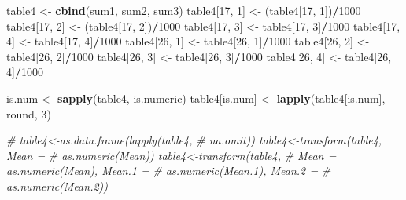 \documentclass[]{tufte-handout}
\newenvironment{Shaded}{\begin{snugshade}}{\end{snugshade}}
\newcommand{\KeywordTok}[1]{\textcolor[rgb]{0.13,0.29,0.53}{\textbf{#1}}}
\newcommand{\DecValTok}[1]{\textcolor[rgb]{0.00,0.00,0.81}{#1}}
\newcommand{\StringTok}[1]{\textcolor[rgb]{0.31,0.60,0.02}{#1}}
\newcommand{\CommentTok}[1]{\textcolor[rgb]{0.56,0.35,0.01}{\textit{#1}}}
\newcommand{\OperatorTok}[1]{\textcolor[rgb]{0.81,0.36,0.00}{\textbf{#1}}}
\newcommand{\NormalTok}[1]{#1}
\begin{document}
\begin{Shaded}
\begin{Highlighting}[]
\NormalTok{table4 <-}\StringTok{ }\KeywordTok{cbind}\NormalTok{(sum1, sum2, sum3)}
\NormalTok{table4[}\DecValTok{17}\NormalTok{, }\DecValTok{1}\NormalTok{] <-}\StringTok{ }\NormalTok{(table4[}\DecValTok{17}\NormalTok{, }\DecValTok{1}\NormalTok{])}\OperatorTok{/}\DecValTok{1000}
\NormalTok{table4[}\DecValTok{17}\NormalTok{, }\DecValTok{2}\NormalTok{] <-}\StringTok{ }\NormalTok{(table4[}\DecValTok{17}\NormalTok{, }\DecValTok{2}\NormalTok{])}\OperatorTok{/}\DecValTok{1000}
\NormalTok{table4[}\DecValTok{17}\NormalTok{, }\DecValTok{3}\NormalTok{] <-}\StringTok{ }\NormalTok{table4[}\DecValTok{17}\NormalTok{, }\DecValTok{3}\NormalTok{]}\OperatorTok{/}\DecValTok{1000}
\NormalTok{table4[}\DecValTok{17}\NormalTok{, }\DecValTok{4}\NormalTok{] <-}\StringTok{ }\NormalTok{table4[}\DecValTok{17}\NormalTok{, }\DecValTok{4}\NormalTok{]}\OperatorTok{/}\DecValTok{1000}
\NormalTok{table4[}\DecValTok{26}\NormalTok{, }\DecValTok{1}\NormalTok{] <-}\StringTok{ }\NormalTok{table4[}\DecValTok{26}\NormalTok{, }\DecValTok{1}\NormalTok{]}\OperatorTok{/}\DecValTok{1000}
\NormalTok{table4[}\DecValTok{26}\NormalTok{, }\DecValTok{2}\NormalTok{] <-}\StringTok{ }\NormalTok{table4[}\DecValTok{26}\NormalTok{, }\DecValTok{2}\NormalTok{]}\OperatorTok{/}\DecValTok{1000}
\NormalTok{table4[}\DecValTok{26}\NormalTok{, }\DecValTok{3}\NormalTok{] <-}\StringTok{ }\NormalTok{table4[}\DecValTok{26}\NormalTok{, }\DecValTok{3}\NormalTok{]}\OperatorTok{/}\DecValTok{1000}
\NormalTok{table4[}\DecValTok{26}\NormalTok{, }\DecValTok{4}\NormalTok{] <-}\StringTok{ }\NormalTok{table4[}\DecValTok{26}\NormalTok{, }\DecValTok{4}\NormalTok{]}\OperatorTok{/}\DecValTok{1000}

\NormalTok{is.num <-}\StringTok{ }\KeywordTok{sapply}\NormalTok{(table4, is.numeric)}
\NormalTok{table4[is.num] <-}\StringTok{ }\KeywordTok{lapply}\NormalTok{(table4[is.num], round, }
    \DecValTok{3}\NormalTok{)}
\end{Highlighting}
\end{Shaded}

\begin{Shaded}
\begin{Highlighting}[]
\CommentTok{# table4<-as.data.frame(lapply(table4,}
\CommentTok{# na.omit)) table4<-transform(table4, Mean =}
\CommentTok{# as.numeric(Mean)) table4<-transform(table4,}
\CommentTok{# Mean = as.numeric(Mean), Mean.1 =}
\CommentTok{# as.numeric(Mean.1), Mean.2 =}
\CommentTok{# as.numeric(Mean.2))}
\end{Highlighting}
\end{Shaded}
\end{document}
